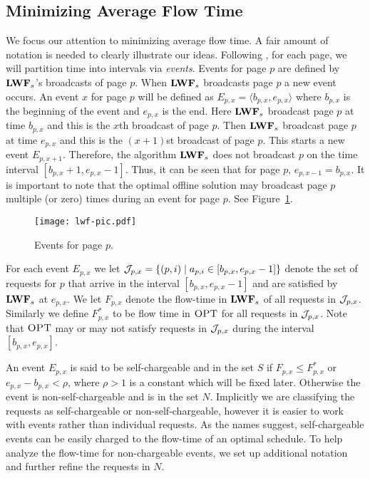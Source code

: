 \documentclass[11pt]{article}
\newcommand{\opt}{\textrm{\sc OPT}}
\newcommand{\len}{\mathfrak{\rho}}
\newcommand{\cJ}{{\cal J}}
\begin{document}
\begin{titlepage}
\section{Minimizing Average Flow Time}\vspace{-2mm}
\label{sec:broadcast} \vspace{-2mm} We focus our attention to minimizing average flow time. A fair amount of notation
is needed to clearly illustrate our ideas.  Following \cite{EdmondsP04}, for each page, we will partition time into
intervals via \emph{events}.  Events for page $p$ are defined by ${\texttt{\bf{LWF}}}_s$'s broadcasts of page $p$. When ${\texttt{\bf{LWF}}}_s$
broadcasts page $p$ a new event occurs. An event $x$ for page $p$ will be defined as $E_{p,x} = \langle b_{p, x},
e_{p,x} \rangle$ where $b_{p,x}$ is the beginning of the event and $e_{p,x}$ is the end. Here ${\texttt{\bf{LWF}}}_s$ broadcast page
$p$ at time $b_{p,x}$ and this is the $x$th broadcast of page $p$. Then ${\texttt{\bf{LWF}}}_s$ broadcast page $p$ at time $e_{p,x}$
and this is the $(x+1)$st broadcast of page $p$. This starts a new event $E_{p,x+1}$. Therefore, the algorithm ${\texttt{\bf{LWF}}}_s$
does not broadcast $p$ on the time interval $[b_{p,x}+1, e_{p,x}-1]$. Thus, it can be seen that for page $p$, $e_{p,
x-1} = b_{p,x}$. It is important to note that the optimal offline solution may broadcast page $p$ multiple (or zero)
times during an event for page $p$.  See Figure~\ref{fig:event}.
\begin{figure}[tbh]
\begin{center}
\texttt{[image: lwf-pic.pdf]}\vspace{-4mm}
\caption{Events for page $p$.} \label{fig:event}
\end{center}
\vspace{-9mm}
\end{figure}


For each event $E_{p,x}$ we let $\cJ_{p,x} = \{(p,i) \mid a_{p,i} \in [b_{p,x}, e_{p,x}-1]\}$ denote the set of
requests for $p$ that arrive in the interval $[b_{p,x}, e_{p,x}-1]$ and are satisfied by ${\texttt{\bf{LWF}}}_s$ at $e_{p,x}$. We let
$F_{p,x}$ denote the flow-time in ${\texttt{\bf{LWF}}}_s$ of all requests in $\cJ_{p,x}$. Similarly we define $F^*_{p,x}$ to be flow
time in $\opt$ for all requests in $\cJ_{p,x}$. Note that $\opt$ may or may not satisfy requests in $\cJ_{p,x}$ during
the interval $[b_{p,x}, e_{p,x}]$.

An event $E_{p,x}$ is said to be self-chargeable and in the set $S$ if
$F_{p,x} \leq F^*_{p,x}$ or $e_{p,x} - b_{p,x} < \len$, where $\len >
1$ is a constant which will be fixed later.  Otherwise the event is
non-self-chargeable and is in the set $N$. Implicitly we are
classifying the requests as self-chargeable or non-self-chargeable,
however it is easier to work with events rather than individual
requests. As the names suggest, self-chargeable events can be easily
charged to the flow-time of an optimal schedule. To help analyze the
flow-time for non-chargeable events, we set up additional notation and
further refine the requests in $N$.


\end{titlepage}
\end{document}
